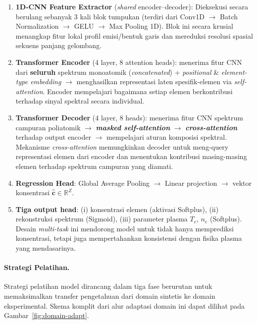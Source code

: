 \documentclass[12pt, a4paper]{article}
\begin{document}
\begin{enumerate}[label=\arabic*., leftmargin=2cm]
    \item \textbf{1D-CNN Feature Extractor} (\textit{shared} encoder--decoder): Dieksekusi secara berulang sebanyak 3 kali blok tumpukan (terdiri dari Conv1D $\rightarrow$ Batch Normalization $\rightarrow$ GELU $\rightarrow$ Max Pooling 1D). Blok ini secara krusial menangkap fitur lokal profil emisi/bentuk garis dan mereduksi resolusi spasial sekuens panjang gelombang.

    \item \textbf{Transformer Encoder} (4 layer, 8 attention heads): menerima fitur CNN dari \textbf{seluruh} spektrum monoatomik (\textit{concatenated}) + \textit{positional} \& \textit{element-type embedding} $\rightarrow$ menghasilkan representasi laten spesifik-elemen via \textit{self-attention}. Encoder mempelajari bagaimana setiap elemen berkontribusi terhadap sinyal spektral secara individual.

    \item \textbf{Transformer Decoder} (4 layer, 8 heads): menerima fitur CNN spektrum campuran poliatomik $\rightarrow$ \textbf{\textit{masked self-attention}} $\rightarrow$ \textbf{\textit{cross-attention}} terhadap output encoder $\rightarrow$ mempelajari aturan komposisi spektral. Mekanisme \textit{cross-attention} memungkinkan decoder untuk meng-query representasi elemen dari encoder dan menentukan kontribusi masing-masing elemen terhadap spektrum campuran yang diamati.

    \item \textbf{Regression Head}: Global Average Pooling $\rightarrow$ Linear projection $\rightarrow$ vektor konsentrasi $\hat{\mathbf{c}} \in \mathbb{R}^Z$.

    \item \textbf{Tiga output head}: (i) konsentrasi elemen (aktivasi Softplus), (ii) rekonstruksi spektrum (Sigmoid), (iii) parameter plasma $T_e$, $n_e$ (Softplus). Desain \textit{multi-task} ini mendorong model untuk tidak hanya memprediksi konsentrasi, tetapi juga mempertahankan konsistensi dengan fisika plasma yang mendasarinya.
\end{enumerate}


\paragraph{Strategi Pelatihan.}
Strategi pelatihan model dirancang dalam tiga fase berurutan untuk memaksimalkan transfer pengetahuan dari domain sintetis ke domain eksperimental. Skema komplit dari alur adaptasi domain ini dapat dilihat pada Gambar~\ref{fig:domain-adapt}.
\end{document}
